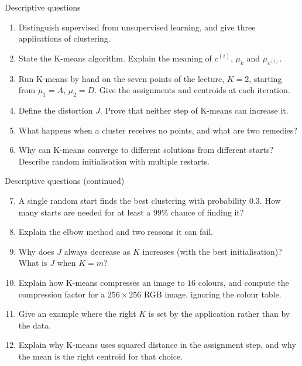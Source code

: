 \documentclass[aspectratio=169,10pt]{beamer}
\begin{document}
\begin{frame}{Descriptive questions}
  \footnotesize
  \begin{enumerate}
    \item Distinguish supervised from unsupervised learning, and give three applications of
          clustering. \hfill{}
    \item State the K-means algorithm. Explain the meaning of $c^{(i)}$, $\mu_k$ and
          $\mu_{c^{(i)}}$. \hfill{}
    \item Run K-means by hand on the seven points of the lecture, $K=2$, starting from
          $\mu_1=A$, $\mu_2=D$. Give the assignments and centroids at each iteration.
          \hfill{}
    \item Define the distortion $J$. Prove that neither step of K-means can increase it.
          \hfill{}
    \item What happens when a cluster receives no points, and what are two remedies?
          \hfill{}
    \item Why can K-means converge to different solutions from different starts? Describe
          random initialisation with multiple restarts. \hfill{}
  \end{enumerate}
\end{frame}

\begin{frame}{Descriptive questions (continued)}
  \footnotesize
  \begin{enumerate}\setcounter{enumi}{6}
    \item A single random start finds the best clustering with probability $0.3$. How many
          starts are needed for at least a $99\%$ chance of finding it? \hfill{}
    \item Explain the elbow method and two reasons it can fail. \hfill{}
    \item Why does $J$ always decrease as $K$ increases (with the best initialisation)? What
          is $J$ when $K=m$? \hfill{}
    \item Explain how K-means compresses an image to $16$ colours, and compute the
          compression factor for a $256\times256$ RGB image, ignoring the colour table.
          \hfill{}
    \item Give an example where the right $K$ is set by the application rather than by the
          data. \hfill{}
    \item Explain why K-means uses squared distance in the assignment step, and why the
          mean is the right centroid for that choice. \hfill{}
  \end{enumerate}
\end{frame}
\end{document}
